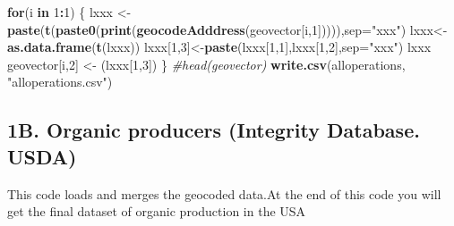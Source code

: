 \documentclass[]{article}
\newenvironment{Shaded}{\begin{snugshade}}{\end{snugshade}}
\newcommand{\KeywordTok}[1]{\textcolor[rgb]{0.13,0.29,0.53}{\textbf{#1}}}
\newcommand{\DataTypeTok}[1]{\textcolor[rgb]{0.13,0.29,0.53}{#1}}
\newcommand{\DecValTok}[1]{\textcolor[rgb]{0.00,0.00,0.81}{#1}}
\newcommand{\StringTok}[1]{\textcolor[rgb]{0.31,0.60,0.02}{#1}}
\newcommand{\CommentTok}[1]{\textcolor[rgb]{0.56,0.35,0.01}{\textit{#1}}}
\newcommand{\ControlFlowTok}[1]{\textcolor[rgb]{0.13,0.29,0.53}{\textbf{#1}}}
\newcommand{\OperatorTok}[1]{\textcolor[rgb]{0.81,0.36,0.00}{\textbf{#1}}}
\newcommand{\NormalTok}[1]{#1}
\begin{document}
\begin{Shaded}
\begin{Highlighting}[]
\ControlFlowTok{for}\NormalTok{(i }\ControlFlowTok{in} \DecValTok{1}\OperatorTok{:}\DecValTok{1}\NormalTok{)}
\NormalTok{\{}
\NormalTok{  lxxx <-}\StringTok{ }\KeywordTok{paste}\NormalTok{(}\KeywordTok{t}\NormalTok{(}\KeywordTok{paste0}\NormalTok{(}\KeywordTok{print}\NormalTok{(}\KeywordTok{geocodeAdddress}\NormalTok{(geovector[i,}\DecValTok{1}\NormalTok{])))),}\DataTypeTok{sep=}\StringTok{"xxx"}\NormalTok{)}
\NormalTok{  lxxx<-}\KeywordTok{as.data.frame}\NormalTok{(}\KeywordTok{t}\NormalTok{(lxxx))}
\NormalTok{  lxxx[}\DecValTok{1}\NormalTok{,}\DecValTok{3}\NormalTok{]<-}\KeywordTok{paste}\NormalTok{(lxxx[}\DecValTok{1}\NormalTok{,}\DecValTok{1}\NormalTok{],lxxx[}\DecValTok{1}\NormalTok{,}\DecValTok{2}\NormalTok{],}\DataTypeTok{sep=}\StringTok{"xxx"}\NormalTok{)}
\NormalTok{  lxxx}
\NormalTok{  geovector[i,}\DecValTok{2}\NormalTok{] <-}\StringTok{ }\NormalTok{(lxxx[}\DecValTok{1}\NormalTok{,}\DecValTok{3}\NormalTok{])}
\NormalTok{\}}
\CommentTok{#head(geovector)}
\KeywordTok{write.csv}\NormalTok{(alloperations, }\StringTok{"alloperations.csv"}\NormalTok{)}
\end{Highlighting}
\end{Shaded}

\subsection{1B. Organic producers (Integrity Database.
USDA)}\label{b.-organic-producers-integrity-database.-usda}

This code loads and merges the geocoded data.At the end of this code you
will get the final dataset of organic production in the USA
\end{document}
